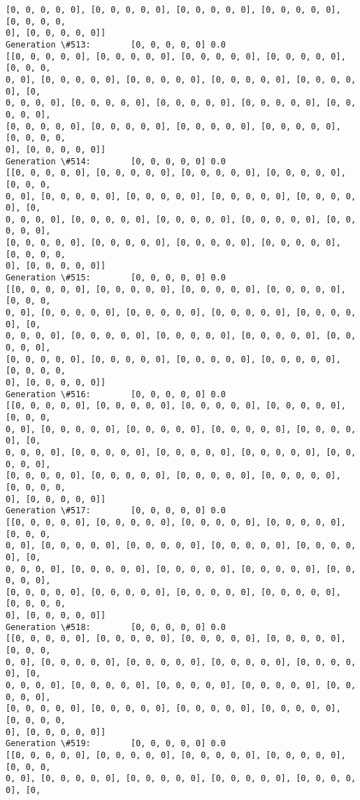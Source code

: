 \documentclass[11pt]{article}
\begin{document}
\begin{Verbatim}[commandchars=\\\{\}]
[0, 0, 0, 0, 0], [0, 0, 0, 0, 0], [0, 0, 0, 0, 0], [0, 0, 0, 0, 0], [0, 0, 0, 0,
0], [0, 0, 0, 0, 0]]
Generation \#513:        [0, 0, 0, 0, 0] 0.0
[[0, 0, 0, 0, 0], [0, 0, 0, 0, 0], [0, 0, 0, 0, 0], [0, 0, 0, 0, 0], [0, 0, 0,
0, 0], [0, 0, 0, 0, 0], [0, 0, 0, 0, 0], [0, 0, 0, 0, 0], [0, 0, 0, 0, 0], [0,
0, 0, 0, 0], [0, 0, 0, 0, 0], [0, 0, 0, 0, 0], [0, 0, 0, 0, 0], [0, 0, 0, 0, 0],
[0, 0, 0, 0, 0], [0, 0, 0, 0, 0], [0, 0, 0, 0, 0], [0, 0, 0, 0, 0], [0, 0, 0, 0,
0], [0, 0, 0, 0, 0]]
Generation \#514:        [0, 0, 0, 0, 0] 0.0
[[0, 0, 0, 0, 0], [0, 0, 0, 0, 0], [0, 0, 0, 0, 0], [0, 0, 0, 0, 0], [0, 0, 0,
0, 0], [0, 0, 0, 0, 0], [0, 0, 0, 0, 0], [0, 0, 0, 0, 0], [0, 0, 0, 0, 0], [0,
0, 0, 0, 0], [0, 0, 0, 0, 0], [0, 0, 0, 0, 0], [0, 0, 0, 0, 0], [0, 0, 0, 0, 0],
[0, 0, 0, 0, 0], [0, 0, 0, 0, 0], [0, 0, 0, 0, 0], [0, 0, 0, 0, 0], [0, 0, 0, 0,
0], [0, 0, 0, 0, 0]]
Generation \#515:        [0, 0, 0, 0, 0] 0.0
[[0, 0, 0, 0, 0], [0, 0, 0, 0, 0], [0, 0, 0, 0, 0], [0, 0, 0, 0, 0], [0, 0, 0,
0, 0], [0, 0, 0, 0, 0], [0, 0, 0, 0, 0], [0, 0, 0, 0, 0], [0, 0, 0, 0, 0], [0,
0, 0, 0, 0], [0, 0, 0, 0, 0], [0, 0, 0, 0, 0], [0, 0, 0, 0, 0], [0, 0, 0, 0, 0],
[0, 0, 0, 0, 0], [0, 0, 0, 0, 0], [0, 0, 0, 0, 0], [0, 0, 0, 0, 0], [0, 0, 0, 0,
0], [0, 0, 0, 0, 0]]
Generation \#516:        [0, 0, 0, 0, 0] 0.0
[[0, 0, 0, 0, 0], [0, 0, 0, 0, 0], [0, 0, 0, 0, 0], [0, 0, 0, 0, 0], [0, 0, 0,
0, 0], [0, 0, 0, 0, 0], [0, 0, 0, 0, 0], [0, 0, 0, 0, 0], [0, 0, 0, 0, 0], [0,
0, 0, 0, 0], [0, 0, 0, 0, 0], [0, 0, 0, 0, 0], [0, 0, 0, 0, 0], [0, 0, 0, 0, 0],
[0, 0, 0, 0, 0], [0, 0, 0, 0, 0], [0, 0, 0, 0, 0], [0, 0, 0, 0, 0], [0, 0, 0, 0,
0], [0, 0, 0, 0, 0]]
Generation \#517:        [0, 0, 0, 0, 0] 0.0
[[0, 0, 0, 0, 0], [0, 0, 0, 0, 0], [0, 0, 0, 0, 0], [0, 0, 0, 0, 0], [0, 0, 0,
0, 0], [0, 0, 0, 0, 0], [0, 0, 0, 0, 0], [0, 0, 0, 0, 0], [0, 0, 0, 0, 0], [0,
0, 0, 0, 0], [0, 0, 0, 0, 0], [0, 0, 0, 0, 0], [0, 0, 0, 0, 0], [0, 0, 0, 0, 0],
[0, 0, 0, 0, 0], [0, 0, 0, 0, 0], [0, 0, 0, 0, 0], [0, 0, 0, 0, 0], [0, 0, 0, 0,
0], [0, 0, 0, 0, 0]]
Generation \#518:        [0, 0, 0, 0, 0] 0.0
[[0, 0, 0, 0, 0], [0, 0, 0, 0, 0], [0, 0, 0, 0, 0], [0, 0, 0, 0, 0], [0, 0, 0,
0, 0], [0, 0, 0, 0, 0], [0, 0, 0, 0, 0], [0, 0, 0, 0, 0], [0, 0, 0, 0, 0], [0,
0, 0, 0, 0], [0, 0, 0, 0, 0], [0, 0, 0, 0, 0], [0, 0, 0, 0, 0], [0, 0, 0, 0, 0],
[0, 0, 0, 0, 0], [0, 0, 0, 0, 0], [0, 0, 0, 0, 0], [0, 0, 0, 0, 0], [0, 0, 0, 0,
0], [0, 0, 0, 0, 0]]
Generation \#519:        [0, 0, 0, 0, 0] 0.0
[[0, 0, 0, 0, 0], [0, 0, 0, 0, 0], [0, 0, 0, 0, 0], [0, 0, 0, 0, 0], [0, 0, 0,
0, 0], [0, 0, 0, 0, 0], [0, 0, 0, 0, 0], [0, 0, 0, 0, 0], [0, 0, 0, 0, 0], [0,

\end{Verbatim}
\end{document}
